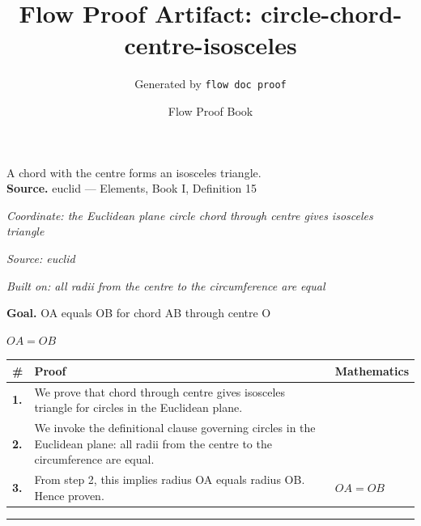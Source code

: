 \documentclass[11pt]{article}
\title{Flow Proof Artifact: circle-chord-centre-isosceles}
\author{Generated by \texttt{flow doc proof}}
\date{Flow Proof Book}
\theoremstyle{definition}
\begin{document}
\maketitle
A chord with the centre forms an isosceles triangle.\\[0.5em]
\textbf{Source.} euclid — Elements, Book I, Definition 15\\[0.5em]
\bigskip
{}\par
\smallskip\noindent\textit{Coordinate: the Euclidean plane \cdot circle \cdot chord through centre gives isosceles triangle}\par
\smallskip\noindent\textit{Source: euclid}\par
\smallskip\noindent\textit{Built on: all radii from the centre to the circumference are equal}\par
\medskip
\noindent\textbf{Goal.} OA equals OB for chord AB through centre O\par
\noindent$\displaystyle OA = OB$\par
\medskip
\noindent
\begin{tabular}{@{} >{\raggedright\arraybackslash}p{} >{\raggedright\arraybackslash}p{} >{\raggedleft\arraybackslash}p{} @{}}
\textbf{\#} & \textbf{Proof} & \textbf{Mathematics} \\
\midrule
\textbf{1.} & We prove that chord through centre gives isosceles triangle for circles in the Euclidean plane. & \\[0.45em]
\textbf{2.} & We invoke the definitional clause governing circles in the Euclidean plane: all radii from the centre to the circumference are equal. & \\[0.45em]
\textbf{3.} & From step 2, this implies radius OA equals radius OB. Hence proven. & $\displaystyle OA = OB$ \\[0.45em]
\bottomrule
\end{tabular}
\label{thm:Geometry-circle-chord_through_centre_gives_isosceles_triangle}
\par\medskip\hrule
\end{document}
